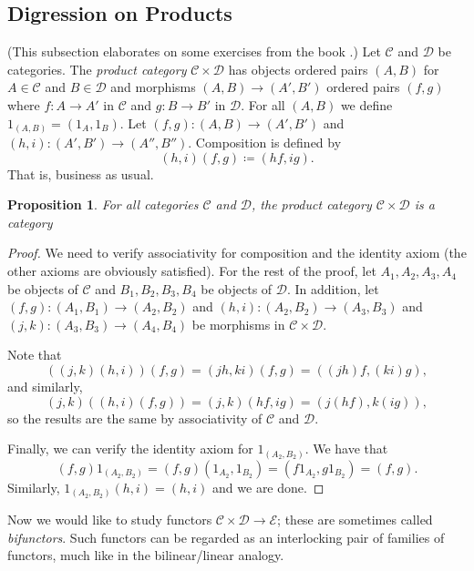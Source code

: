 \documentclass{report}
\theoremstyle{definition}
\theoremstyle{plain}
\newtheorem{prop}[thm]{Proposition}
\theoremstyle{definition}
\begin{document}
	 \subsection*{Digression on Products}
	 (This subsection elaborates on some exercises from the book \cite{Leinster2014}.) Let $\mathcal{C}$ and $\mathcal{D}$ be categories. The \emph{product category} $\mathcal{C}\times \mathcal{D}$ has objects ordered pairs $(A,B)$ for $A\in\mathcal{C}$ and $B\in\mathcal{D}$ and morphisms $(A,B)\to(A',B')$ ordered pairs $(f,g)$ where $f\colon A \to A'$ in $\mathcal{C}$ and $g\colon B\to B'$ in $\mathcal{D}$. For all $(A,B)$ we define $1_{(A,B)} = (1_A,1_B)$. Let $(f,g)\colon (A,B)\to (A',B')$ and $(h,i)\colon (A',B')\to (A'',B'')$. Composition is defined by
	 \[
	 	(h,i)(f,g) \coloneqq (hf, ig).
	 \]
	 That is, business as usual.
	 \begin{prop}
	 	For all categories $\mathcal{C}$ and $\mathcal{D}$, the product category $\mathcal{C}\times\mathcal{D}$ is a category 
	 \end{prop}
	 \begin{proof}
	 	We need to verify associativity for composition and the identity axiom (the other axioms are obviously satisfied). For the rest of the proof, let $A_1,A_2,A_3,A_4$ be objects of $\mathcal{C}$ and $B_1,B_2,B_3,B_4$ be objects of $\mathcal{D}$. In addition, let $(f,g)\colon (A_1,B_1) \to (A_2,B_2)$ and $(h,i)\colon (A_2,B_2)\to (A_3,B_3)$ and $(j,k)\colon (A_3,B_3)\to (A_4,B_4)$ be morphisms in $\mathcal{C}\times \mathcal{D}$.
	 	
	 	Note that
	 	\[
	 		((j,k)(h,i))(f,g) = (jh,ki)(f,g) = ((jh)f,(ki)g),
	 	\]
	 	and similarly,
	 	\[
	 		(j,k)((h,i)(f,g)) = (j,k)(hf,ig) = (j(hf),k(ig)),
	 	\]
	 	so the results are the same by associativity of $\mathcal{C}$ and $\mathcal{D}$. 
	 	
	 	Finally, we can verify the identity axiom for $1_{(A_2,B_2)}$. We have that
	 	\[
	 		(f,g)1_{(A_2,B_2)} = (f,g)(1_{A_2},1_{B_2}) = (f1_{A_2}, g1_{B_2}) = (f,g).
	 	\]	
	 	Similarly, $1_{(A_2,B_2)} (h,i) = (h,i)$ and we are done.
	 \end{proof}
	 Now we would like to study functors $\mathcal{C}\times \mathcal{D}\to\mathcal{E}$; these are sometimes called \emph{bifunctors}. Such functors can be regarded as an interlocking pair of families of functors, much like in the bilinear/linear analogy.
	 
\end{document}
